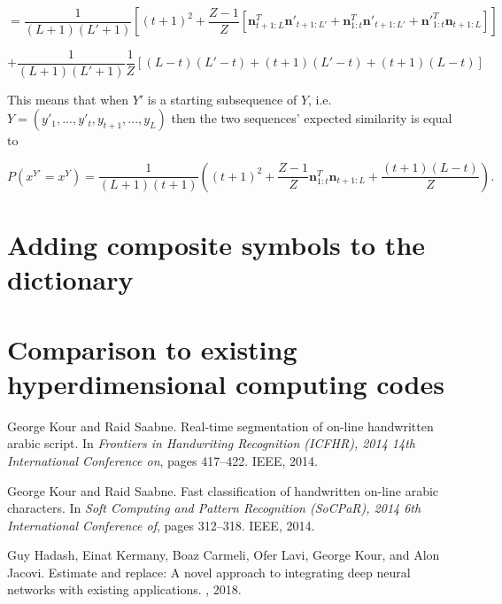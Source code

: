 \documentclass{article}
\begin{document}
$$
=\frac{1}{(L+1)(L'+1)}\left[(t+1)^2 + \frac{Z-1}{Z}\left[\mathbf{n}^T_{t+1:L}\mathbf{n}'_{t+1:L'} + \mathbf{n}^T_{1:t}\mathbf{n}'_{t+1:L'} + \mathbf{n}'^T_{1:t}\mathbf{n}_{t+1:L}\right]\right]
$$

$$
+ \frac{1}{(L+1)(L'+1)}\frac{1}{Z}\left[(L-t)(L'-t) + (t+1)(L'-t) + (t+1)(L-t)\right]
$$

This means that when $Y'$ is a starting subsequence of $Y$, i.e. $Y = (y'_1, ..., y'_t, y_{t+1}, ..., y_L)$ then the two sequences' expected similarity is equal to

$$P(x^{Y'} = x^Y) = \frac{1}{(L+1)(t+1)}\left((t+1)^2 + \frac{Z-1}{Z}\mathbf{n}^T_{1:t}\mathbf{n}_{t+1:L} + \frac{(t+1)(L-t)}{Z}\right).$$

\section{Adding composite symbols to the dictionary}

\section{Comparison to existing hyperdimensional computing codes}




  


\begin{thebibliography}{1}

George Kour and Raid Saabne.
\newblock Real-time segmentation of on-line handwritten arabic script.
\newblock In {\em Frontiers in Handwriting Recognition (ICFHR), 2014 14th
  International Conference on}, pages 417--422. IEEE, 2014.

George Kour and Raid Saabne.
\newblock Fast classification of handwritten on-line arabic characters.
\newblock In {\em Soft Computing and Pattern Recognition (SoCPaR), 2014 6th
  International Conference of}, pages 312--318. IEEE, 2014.

Guy Hadash, Einat Kermany, Boaz Carmeli, Ofer Lavi, George Kour, and Alon
  Jacovi.
\newblock Estimate and replace: A novel approach to integrating deep neural
  networks with existing applications.
, 2018.

\end{thebibliography}
\end{document}
